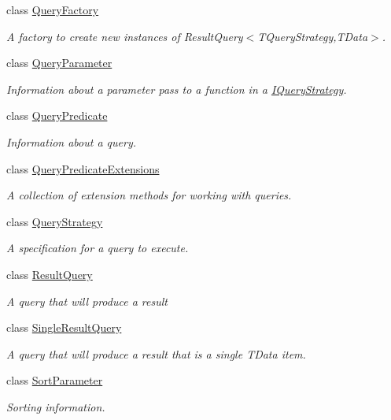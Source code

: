 \begin{DoxyCompactItemize}
class \hyperlink{classCqrs_1_1Repositories_1_1Queries_1_1QueryFactory}{Query\+Factory}
\begin{DoxyCompactList}\small\item\em A factory to create new instances of Result\+Query$<$\+T\+Query\+Strategy,\+T\+Data$>$. \end{DoxyCompactList}\item 
class \hyperlink{classCqrs_1_1Repositories_1_1Queries_1_1QueryParameter}{Query\+Parameter}
\begin{DoxyCompactList}\small\item\em Information about a parameter pass to a function in a \hyperlink{interfaceCqrs_1_1Repositories_1_1Queries_1_1IQueryStrategy}{I\+Query\+Strategy}. \end{DoxyCompactList}\item 
class \hyperlink{classCqrs_1_1Repositories_1_1Queries_1_1QueryPredicate}{Query\+Predicate}
\begin{DoxyCompactList}\small\item\em Information about a query. \end{DoxyCompactList}\item 
class \hyperlink{classCqrs_1_1Repositories_1_1Queries_1_1QueryPredicateExtensions}{Query\+Predicate\+Extensions}
\begin{DoxyCompactList}\small\item\em A collection of extension methods for working with queries. \end{DoxyCompactList}\item 
class \hyperlink{classCqrs_1_1Repositories_1_1Queries_1_1QueryStrategy}{Query\+Strategy}
\begin{DoxyCompactList}\small\item\em A specification for a query to execute. \end{DoxyCompactList}\item 
class \hyperlink{classCqrs_1_1Repositories_1_1Queries_1_1ResultQuery}{Result\+Query}
\begin{DoxyCompactList}\small\item\em A query that will produce a result \end{DoxyCompactList}\item 
class \hyperlink{classCqrs_1_1Repositories_1_1Queries_1_1SingleResultQuery}{Single\+Result\+Query}
\begin{DoxyCompactList}\small\item\em A query that will produce a result that is a single {\itshape T\+Data}  item. \end{DoxyCompactList}\item 
class \hyperlink{classCqrs_1_1Repositories_1_1Queries_1_1SortParameter}{Sort\+Parameter}
\begin{DoxyCompactList}\small\item\em Sorting information. \end{DoxyCompactList}\end{DoxyCompactItemize}
